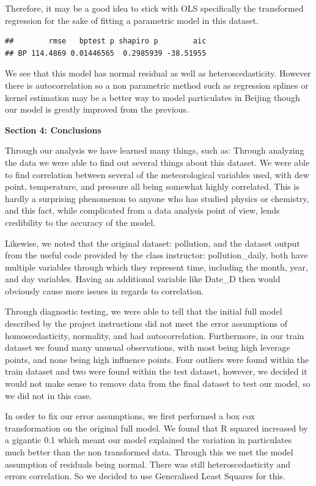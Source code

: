\documentclass[
]{article}
\begin{document}
Therefore, it may be a good idea to stick with OLS specifically the
transformed regression for the sake of fitting a parametric model in
this dataset.

\begin{verbatim}
##        rmse   bptest p shapiro p        aic
## BP 114.4869 0.01446565  0.2985939 -38.51955
\end{verbatim}

We see that this model has normal residual as well as
heteroscedasticity. However there is autocorrelation so a non parametric
method such as regression splines or kernel estimation may be a better
way to model particulates in Beijing though our model is greatly
improved from the previous.

\textbf{Section 4: Conclusions}

Through our analysis we have learned many things, such as: Through
analyzing the data we were able to find out several things about this
dataset. We were able to find correlation between several of the
meteorological variables used, with dew point, temperature, and pressure
all being somewhat highly correlated. This is hardly a surprising
phenomenon to anyone who has studied physics or chemistry, and this
fact, while complicated from a data analysis point of view, lends
credibility to the accuracy of the model.

Likewise, we noted that the original dataset: pollution, and the dataset
output from the useful code provided by the class instructor:
pollution\_daily, both have multiple variables through which they
represent time, including the month, year, and day variables. Having an
additional variable like Date\_D then would obviously cause more issues
in regards to correlation.

Through diagnostic testing, we were able to tell that the initial full
model described by the project instructions did not meet the error
assumptions of homoscedasticity, normality, and had autocorrelation.
Furthermore, in our train dataset we found many unusual observations,
with most being high leverage points, and none being high influence
points. Four outliers were found within the train dataset and two were
found within the test dataset, however, we decided it would not make
sense to remove data from the final dataset to test our model, so we did
not in this case.

In order to fix our error assumptions, we first performed a box cox
transformation on the original full model. We found that R squared
increased by a gigantic 0.1 which meant our model explained the
variation in particulates much better than the non transformed data.
Through this we met the model assumption of residuals being normal.
There was still heteroscedasticity and errors correlation. So we decided
to use Generalised Least Squares for this.
\end{document}
